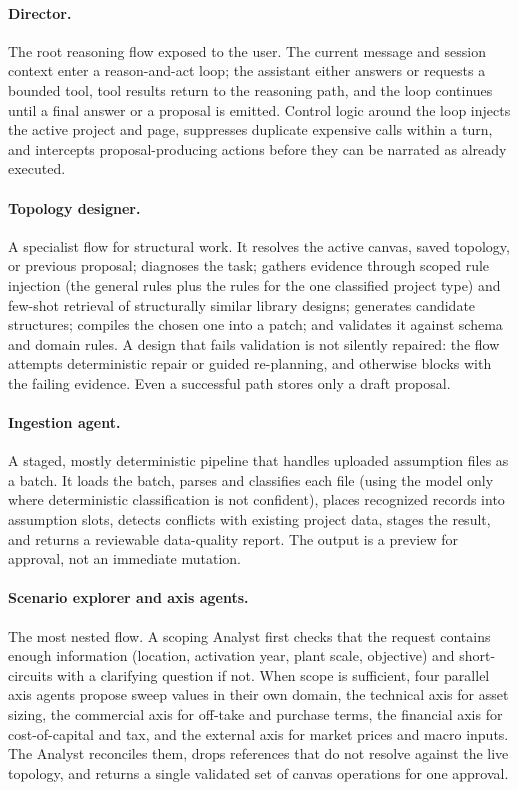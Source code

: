 \paragraph{Director.} The root reasoning flow exposed to the user. The current
message and session context enter a reason-and-act loop; the assistant either
answers or requests a bounded tool, tool results return to the reasoning path, and
the loop continues until a final answer or a proposal is emitted. Control logic
around the loop injects the active project and page, suppresses duplicate expensive
calls within a turn, and intercepts proposal-producing actions before they can be
narrated as already executed.

\paragraph{Topology designer.} A specialist flow for structural work. It resolves
the active canvas, saved topology, or previous proposal; diagnoses the task;
gathers evidence through scoped rule injection (the general rules plus the rules
for the one classified project type) and few-shot retrieval of structurally
similar library designs; generates candidate structures; compiles the chosen one
into a patch; and validates it against schema and domain rules. A design that fails
validation is not silently repaired: the flow attempts deterministic repair or
guided re-planning, and otherwise blocks with the failing evidence. Even a
successful path stores only a draft proposal.

\paragraph{Ingestion agent.} A staged, mostly deterministic pipeline that handles
uploaded assumption files as a batch. It loads the batch, parses and classifies
each file (using the model only where deterministic classification is not
confident), places recognized records into assumption slots, detects conflicts
with existing project data, stages the result, and returns a reviewable
data-quality report. The output is a preview for approval, not an immediate
mutation.

\paragraph{Scenario explorer and axis agents.} The most nested flow. A scoping
Analyst first checks that the request contains enough information (location,
activation year, plant scale, objective) and short-circuits with a clarifying
question if not. When scope is sufficient, four parallel axis agents propose sweep
values in their own domain, the technical axis for asset sizing, the commercial
axis for off-take and purchase terms, the financial axis for cost-of-capital and
tax, and the external axis for market prices and macro inputs. The Analyst
reconciles them, drops references that do not resolve against the live topology,
and returns a single validated set of canvas operations for one approval.

